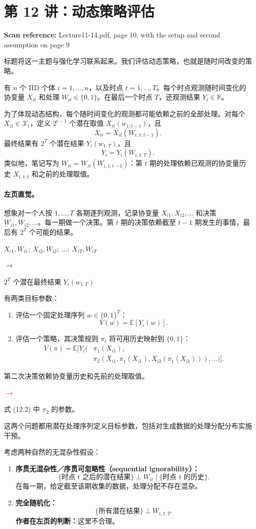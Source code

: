 \documentclass[11pt,a4paper]{article}
\newcommand{\sourcepages}[1]{\par{\small\sffamily\color{muted}\textbf{Scan reference:} #1\par}\nobreak\smallskip\nopagebreak[4]}
\newcommand{\notearrow}[3]{%
\par\Needspace{6\baselineskip}\smallskip
\noindent\begin{minipage}[c]{0.43\linewidth}\raggedright\color{#1}#2\end{minipage}%
\hfill\textcolor{#1}{\(\longrightarrow\)}\hfill%
\begin{minipage}[c]{0.43\linewidth}\raggedright#3\end{minipage}\par\smallskip}
\begin{document}
\section{第 12 讲：动态策略评估}
\sourcepages{Lecture11-14.pdf, page 10, with the setup and second assumption on page 9}
标题将这一主题与强化学习联系起来。我们评估动态策略，也就是随时间改变的策略。

有 $n$ 个 IID 个体 $i=1,\ldots,n$，以及时点 $t=1,\ldots,T$。每个时点观测随时间变化的协变量 $X_{it}$ 和处理 $W_{it}\in\{0,1\}$。在最后一个时点 $T$，还观测结果 $Y_i\in\mathbb R$。

为了体现动态结构，每个随时间变化的观测都可能依赖之前的全部处理。对每个 $X_{it}\in\mathcal X_t$，定义 $2^{t-1}$ 个潜在取值 $X_{it}(w_{1:t-1})$，且
\[
 X_{it}=X_{it}(W_{i,1:t-1}).
\]
最终结果有 $2^T$ 个潜在结果 $Y_i(w_{1:T})$，且
\[
 Y_i=Y_i(W_{i,1:T}).
\]
类似地，笔记写为 $W_{it}=W_{it}(W_{i,1:t-1})$：第 $t$ 期的处理依赖已观测的协变量历史 $X_{i,1:t}$ 和之前的处理取值。

\paragraph{左页直觉。}
想象对一个人按 $1,\ldots,T$ 各期逐列观测，记录协变量 $X_{i1},X_{i2},\ldots$ 和决策 $W_{i1},W_{i2},\ldots$。每一期做一个决策。第 $t$ 期的决策依赖截至 $t-1$ 期发生的事情，最后有 $2^T$ 个可能的结果。
\notearrow{black}{$X_{i1},W_{i1};\ X_{i2},W_{i2};\ \ldots;\ X_{iT},W_{iT}$}{$2^T$ 个潜在最终结果 $Y_i(w_{1:T})$}

有两类目标参数：
\begin{enumerate}
 \item 评估一个固定处理序列 $w\in\{0,1\}^T$：
 \[V(w)=\mathbb E[Y_i(w)].\]
 \item 评估一个策略，其决策规则 $\pi_t$ 将可用历史映射到 $\{0,1\}$：
 \begin{align*}
 V(\pi)=\mathbb E\bigl[Y_i\bigl(&\pi_1(X_{i1}),\\
 &\pi_2(X_{i1},\pi_1(X_{i1}),X_{i2}(\pi_1(X_{i1}))),\ldots\bigr)\bigr].\tag{12.2}
 \end{align*}
\end{enumerate}
\notearrow{red}{第二次决策依赖协变量历史和先前的处理取值。}{式 (12.2) 中 $\pi_2$ 的参数。}这两个问题都用潜在处理序列定义目标参数，包括对生成数据的处理分配分布实施干预。

考虑两种自然的无混杂性假设：
\begin{enumerate}
 \item \textbf{序贯无混杂性／序贯可忽略性（sequential ignorability）：}
 \[
 \{\text{时点 }t\text{ 之后的潜在结果}\}\perp W_{it}
 \mid\{\text{时点 }t\text{ 的历史}\}.
 \]
 在每一期，给定截至该期收集的数据，处理分配不存在混杂。
 \item \textbf{完全随机化：}
 \[\{\text{所有潜在结果}\}\perp W_{i,1:T}.\]
 \textbf{作者在左页的判断：}这里不合理。
\end{enumerate}
\end{document}
